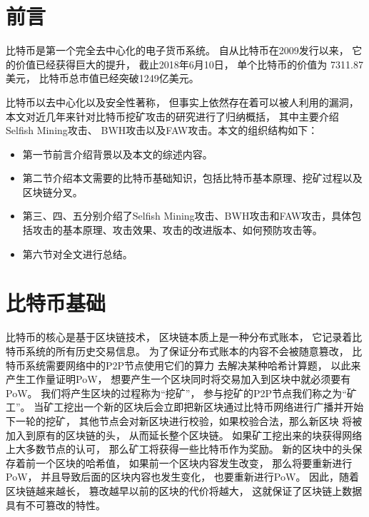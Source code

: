 \documentclass[a4paper, 11pt]{article}
\begin{document}
\begin{CJK*}{UTF8}{gbsn}
\begin{abstract}
        

    \end{abstract}

    \section{前言}

    \indent

    比特币\cite{ref_article1}是第一个完全去中心化的电子货币系统。
    自从比特币在2009发行以来，
    它的价值已经获得巨大的提升，
    截止2018年6月10日，
    单个比特币的价值为
    7311.87美元，
    比特币总市值已经突破1249亿美元\cite{ref_web1}。


    比特币以去中心化以及安全性著称，
    但事实上依然存在着可以被人利用的漏洞，
    本文对近几年来针对比特币挖矿攻击的研究进行了归纳概括，
    其中主要介绍Selfish Mining攻击\cite{ref_selfish_mining1, ref_selfish_mining2, ref_selfish_mining3}、
    BWH攻击\cite{ref_BWH1, ref_BWH2, ref_article3}以及FAW攻击\cite{ref_FAW}。本文的组织结构如下：
    \begin{itemize}
        \item 第一节前言介绍背景以及本文的综述内容。
        \item 第二节介绍本文需要的比特币基础知识，包括比特币基本原理、挖矿过程以及区块链分叉。
        \item 第三、四、五分别介绍了Selfish Mining攻击、BWH攻击和FAW攻击，具体包括攻击的基本原理、攻击效果、攻击的改进版本、如何预防攻击等。
        \item 第六节对全文进行总结。

    \end{itemize}

    \section{比特币基础}

    \indent
    
    比特币的核心是基于区块链技术，
    区块链本质上是一种分布式账本，
    它记录着比特币系统的所有历史交易信息。
    为了保证分布式账本的内容不会被随意篡改，
    比特币系统需要网络中的P2P节点使用它们的算力
    去解决某种哈希计算题，
    以此来产生工作量证明PoW，
    想要产生一个区块同时将交易加入到区块中就必须要有PoW。
    我们将产生区块的过程称为“挖矿”，
    参与挖矿的P2P节点我们称之为“矿工”。
    当矿工挖出一个新的区块后会立即把新区块通过比特币网络进行广播并开始下一轮的挖矿，
    其他节点会对新区块进行校验，如果校验合法，那么新区块
    将被加入到原有的区块链的头，
    从而延长整个区块链。
    如果矿工挖出来的块获得网络上大多数节点的认可，
    那么矿工将获得一些比特币作为奖励。
    新的区块中的头保存着前一个区块的哈希值，
    如果前一个区块内容发生改变，
    那么将要重新进行PoW，
    并且导致后面的区块内容也发生变化，
    也要重新进行PoW。
    因此，随着区块链越来越长，
    篡改越早以前的区块的代价将越大，
    这就保证了区块链上数据具有不可篡改的特性。



\end{CJK*}
\end{document}
